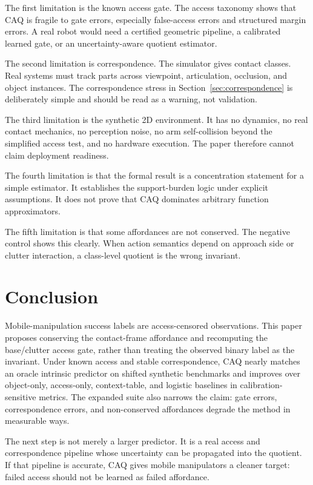 \documentclass{article}
\begin{document}
The first limitation is the known access gate. The access taxonomy shows that CAQ is fragile to gate errors, especially false-access errors and structured margin errors. A real robot would need a certified geometric pipeline, a calibrated learned gate, or an uncertainty-aware quotient estimator.

The second limitation is correspondence. The simulator gives contact classes. Real systems must track parts across viewpoint, articulation, occlusion, and object instances. The correspondence stress in Section~\ref{sec:correspondence} is deliberately simple and should be read as a warning, not validation.

The third limitation is the synthetic 2D environment. It has no dynamics, no real contact mechanics, no perception noise, no arm self-collision beyond the simplified access test, and no hardware execution. The paper therefore cannot claim deployment readiness.

The fourth limitation is that the formal result is a concentration statement for a simple estimator. It establishes the support-burden logic under explicit assumptions. It does not prove that CAQ dominates arbitrary function approximators.

The fifth limitation is that some affordances are not conserved. The negative control shows this clearly. When action semantics depend on approach side or clutter interaction, a class-level quotient is the wrong invariant.

\section{Conclusion}

Mobile-manipulation success labels are access-censored observations. This paper proposes conserving the contact-frame affordance and recomputing the base/clutter access gate, rather than treating the observed binary label as the invariant. Under known access and stable correspondence, CAQ nearly matches an oracle intrinsic predictor on shifted synthetic benchmarks and improves over object-only, access-only, context-table, and logistic baselines in calibration-sensitive metrics. The expanded suite also narrows the claim: gate errors, correspondence errors, and non-conserved affordances degrade the method in measurable ways.

The next step is not merely a larger predictor. It is a real access and correspondence pipeline whose uncertainty can be propagated into the quotient. If that pipeline is accurate, CAQ gives mobile manipulators a cleaner target: failed access should not be learned as failed affordance.
\end{document}
